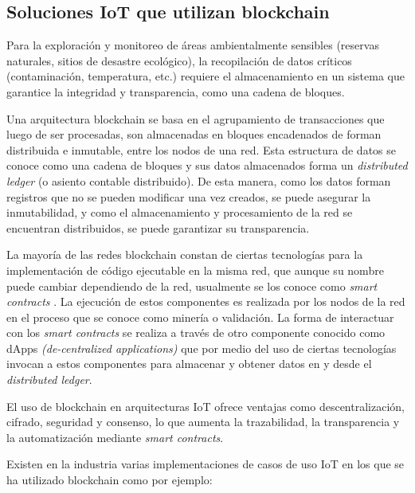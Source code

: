 \subsection{Soluciones IoT que utilizan blockchain}


Para la exploración y monitoreo de áreas ambientalmente sensibles (reservas naturales, sitios de desastre ecológico), la recopilación de datos críticos (contaminación, temperatura, etc.) requiere el almacenamiento en un sistema que garantice la integridad y transparencia, como una cadena de bloques.

Una arquitectura blockchain \cite{blockchain} se basa en el agrupamiento de transacciones que luego de ser procesadas, son almacenadas en bloques encadenados de forman distribuida e inmutable, entre los nodos de una red. Esta estructura de datos se conoce como una cadena de bloques y sus datos almacenados forma un \textit{distributed ledger} (o asiento contable distribuido). De esta manera, como los datos forman registros que no se pueden modificar una vez creados, se puede asegurar la inmutabilidad, y como el almacenamiento y procesamiento de la red se encuentran distribuidos, se puede garantizar su transparencia.

La mayoría de las redes blockchain constan de ciertas tecnologías para la implementación de código ejecutable en la misma red, que aunque su nombre puede cambiar dependiendo de la red, usualmente se los conoce como \textit{smart contracts} \citep{smart_contracts}. La ejecución de estos componentes es realizada por los nodos de la red en el proceso que se conoce como minería o validación. La forma de interactuar con los \textit{smart contracts} se realiza a través de otro componente conocido como dApps \textit{(de-centralized applications)} \citep{dapp} que por medio del uso de ciertas tecnologías invocan a estos componentes para almacenar y obtener datos en y desde el \textit{distributed ledger}.

El uso de blockchain en arquitecturas IoT ofrece ventajas como descentralización, cifrado, seguridad y consenso, lo que aumenta la trazabilidad, la transparencia y la automatización mediante \textit{smart contracts}.

Existen en la industria varias implementaciones de casos de uso IoT en los que se ha utilizado blockchain como por ejemplo:

